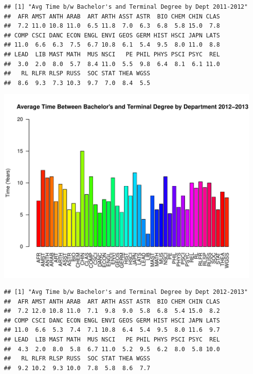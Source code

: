\documentclass[12pt,a4paper]{article}\usepackage[]{graphicx}\usepackage[]{color}
\makeatletter
\def\maxwidth{ %
  \ifdim\Gin@nat@width>\linewidth
    \linewidth
  \else
    \Gin@nat@width
  \fi
}
\newenvironment{kframe}{%
 \def\at@end@of@kframe{}%
 \ifinner\ifhmode%
  \def\at@end@of@kframe{\end{minipage}}%
  \begin{minipage}{\columnwidth}%
 \fi\fi%
 \def\FrameCommand##1{\hskip\@totalleftmargin \hskip-\fboxsep
 \colorbox{shadecolor}{##1}\hskip-\fboxsep
     \hskip-\linewidth \hskip-\@totalleftmargin \hskip\columnwidth}%
 \MakeFramed {\advance\hsize-\width
   \@totalleftmargin\z@ \linewidth\hsize
   \@setminipage}}%
 {\par\unskip\endMakeFramed%
 \at@end@of@kframe}
\newenvironment{knitrout}{}{} %
\theoremstyle{definition}
\makeatother
\begin{document}
\begin{knitrout}
\begin{kframe}\begin{verbatim}
## [1] "Avg Time b/w Bachelor's and Terminal Degree by Dept 2011-2012"
##  AFR AMST ANTH ARAB  ART ARTH ASST ASTR  BIO CHEM CHIN CLAS 
##  7.2 11.0 10.8 11.0  6.5 11.8  7.0  6.3  6.8  5.8 15.0  7.8 
## COMP CSCI DANC ECON ENGL ENVI GEOS GERM HIST HSCI JAPN LATS 
## 11.0  6.6  6.3  7.5  6.7 10.8  6.1  5.4  9.5  8.0 11.0  8.8 
## LEAD  LIB MAST MATH  MUS NSCI   PE PHIL PHYS PSCI PSYC  REL 
##  3.0  2.0  8.0  5.7  8.4 11.0  5.5  9.8  6.4  8.1  6.1 11.0 
##   RL RLFR RLSP RUSS  SOC STAT THEA WGSS 
##  8.6  9.3  7.3 10.3  9.7  7.0  8.4  5.5
\end{verbatim}
\end{kframe}
\includegraphics[width=\maxwidth]{figure/unnamed-chunk-13-9} 
\begin{kframe}\begin{verbatim}
## [1] "Avg Time b/w Bachelor's and Terminal Degree by Dept 2012-2013"
##  AFR AMST ANTH ARAB  ART ARTH ASST ASTR  BIO CHEM CHIN CLAS 
##  7.2 12.0 10.8 11.0  7.1  9.8  9.0  5.8  6.8  5.4 15.0  8.2 
## COMP CSCI DANC ECON ENGL ENVI GEOS GERM HIST HSCI JAPN LATS 
## 11.0  6.6  5.3  7.4  7.1 10.8  6.4  5.4  9.5  8.0 11.6  9.7 
## LEAD  LIB MAST MATH  MUS NSCI   PE PHIL PHYS PSCI PSYC  REL 
##  4.3  2.0  8.0  5.8  6.7 11.0  5.2  9.5  6.2  8.0  5.8 10.0 
##   RL RLFR RLSP RUSS  SOC STAT THEA WGSS 
##  9.2 10.2  9.3 10.0  7.8  5.8  8.6  7.7
\end{verbatim}
\end{kframe}

\end{knitrout}
\end{document}
